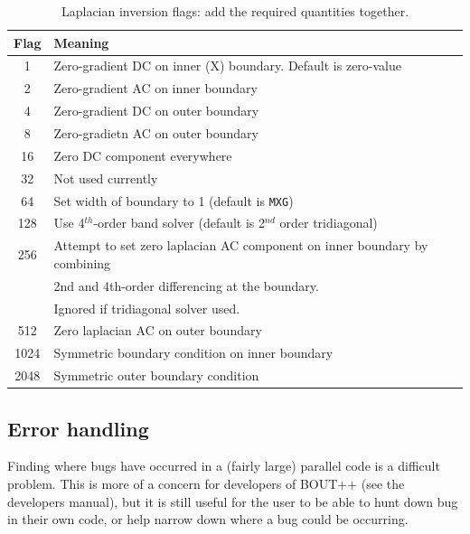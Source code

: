 \documentclass[12pt]{article}
\newcommand{\code}[1]{\texttt{#1}}
\begin{document}
\begin{table}[htbp!]
\caption{Laplacian inversion flags: add the required quantities together.}
\label{tab:laplaceflags}
\centering
\begin{tabular}[c]{c | l}
\hline
Flag & Meaning \\
\hline
1 & Zero-gradient DC on inner (X) boundary. Default is zero-value \\
2 & Zero-gradient AC on inner boundary \\
4 & Zero-gradient DC on outer boundary \\
8 & Zero-gradietn AC on outer boundary \\
16 & Zero DC component everywhere \\
32 & Not used currently \\
64 & Set width of boundary to 1 (default is \code{MXG}) \\
128 & Use 4$^{th}$-order band solver (default is 2$^{nd}$ order tridiagonal) \\
256 & Attempt to set zero laplacian AC component on inner boundary by combining \\
    & 2nd and 4th-order differencing at the boundary. \\
    & Ignored if tridiagonal solver used. \\
512 & Zero laplacian AC on outer boundary \\
1024 & Symmetric boundary condition on inner boundary \\
2048 & Symmetric outer boundary condition \\
\hline
\end{tabular}
\end{table}

\subsection{Error handling}

Finding where bugs have occurred in a (fairly large) parallel code is a difficult problem.
This is more of a concern for developers of BOUT++ (see the developers manual), but it is still
useful for the user to be able to hunt down bug in their own code, or help narrow down where
a bug could be occurring.
\end{document}
